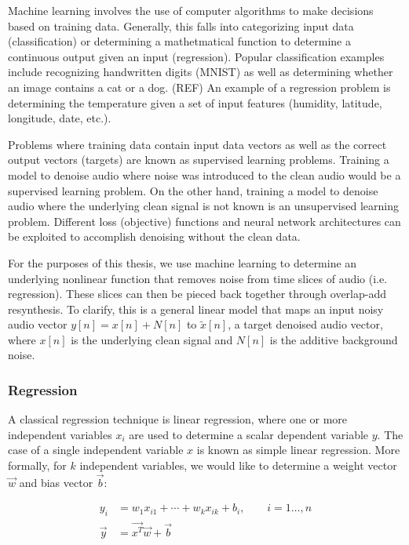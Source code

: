 Machine learning involves the use of computer algorithms to make decisions based on training data. Generally, this falls into categorizing input data (classification) or determining a mathetmatical function to determine a continuous output given an input (regression). Popular classification examples include recognizing handwritten digits (MNIST) as well as determining whether an image contains a cat or a dog. (REF) An example of a regression problem is determining the temperature given a set of input features (humidity, latitude, longitude, date, etc.).

Problems where training data contain input data vectors as well as the correct output vectors (targets) are known as supervised learning problems. Training a model to denoise audio where noise was introduced to the clean audio would be a supervised learning problem. On the other hand, training a model to denoise audio where the underlying clean signal is not known is an unsupervised learning problem. Different loss (objective) functions and neural network architectures can be exploited to accomplish denoising without the clean data.

For the purposes of this thesis, we use machine learning to determine an underlying nonlinear function that removes noise from time slices of audio (i.e. regression). These slices can then be pieced back together through overlap-add resynthesis. To clarify, this is a general linear model that maps an input noisy audio vector $y[n]=x[n]+N[n]$ to $\tilde{x}[n]$, a target denoised audio vector, where $x[n]$ is the underlying clean signal and $N[n]$ is the additive background noise.

\subsubsection{Regression}
A classical regression technique is linear regression, where one or more independent variables $x_{i}$ are used to determine a scalar dependent variable $y$. The case of a single independent variable $x$ is known as simple linear regression. More formally, for $k$ independent variables, we would like to determine a weight vector $\vec{w}$ and bias vector $\vec{b}$:

\begin{align}
y_i &= w_{1}x_{i1} + \cdots + w_{k}x_{ik} + b_{i}, \qquad i=1\ldots ,n \\
\vec{y} &= \vec{x^T}\vec{w} + \vec{b}
\end{align}

